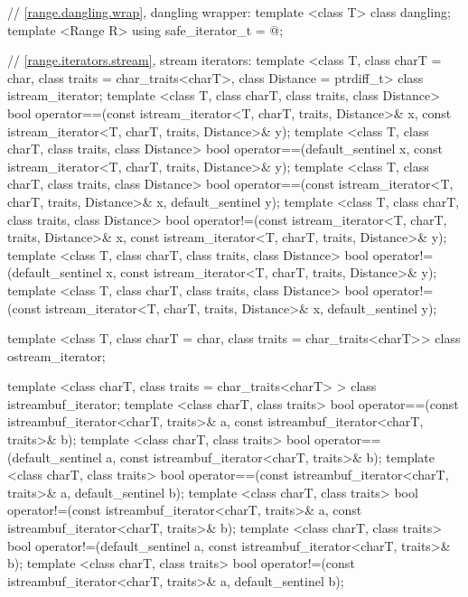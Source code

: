 {\begin{codeblock}
{{    // \ref{range.dangling.wrap}, dangling wrapper:
    template <class T> class dangling;
    template <Range R> using safe_iterator_t = @\seebelow@;

    // \ref{range.iterators.stream}, stream iterators:
    template <class T, class charT = char, class traits = char_traits<charT>,
        class Distance = ptrdiff_t>
    class istream_iterator;
    template <class T, class charT, class traits, class Distance>
      bool operator==(const istream_iterator<T, charT, traits, Distance>& x,
              const istream_iterator<T, charT, traits, Distance>& y);
    template <class T, class charT, class traits, class Distance>
      bool operator==(default_sentinel x,
              const istream_iterator<T, charT, traits, Distance>& y);
    template <class T, class charT, class traits, class Distance>
      bool operator==(const istream_iterator<T, charT, traits, Distance>& x,
              default_sentinel y);
    template <class T, class charT, class traits, class Distance>
      bool operator!=(const istream_iterator<T, charT, traits, Distance>& x,
              const istream_iterator<T, charT, traits, Distance>& y);
    template <class T, class charT, class traits, class Distance>
    bool operator!=(default_sentinel x,
              const istream_iterator<T, charT, traits, Distance>& y);
    template <class T, class charT, class traits, class Distance>
      bool operator!=(const istream_iterator<T, charT, traits, Distance>& x,
              default_sentinel y);

    template <class T, class charT = char, class traits = char_traits<charT>>
        class ostream_iterator;

    template <class charT, class traits = char_traits<charT> >
      class istreambuf_iterator;
    template <class charT, class traits>
      bool operator==(const istreambuf_iterator<charT, traits>& a,
              const istreambuf_iterator<charT, traits>& b);
    template <class charT, class traits>
      bool operator==(default_sentinel a,
              const istreambuf_iterator<charT, traits>& b);
    template <class charT, class traits>
      bool operator==(const istreambuf_iterator<charT, traits>& a,
              default_sentinel b);
    template <class charT, class traits>
      bool operator!=(const istreambuf_iterator<charT, traits>& a,
              const istreambuf_iterator<charT, traits>& b);
    template <class charT, class traits>
      bool operator!=(default_sentinel a,
              const istreambuf_iterator<charT, traits>& b);
    template <class charT, class traits>
      bool operator!=(const istreambuf_iterator<charT, traits>& a,
              default_sentinel b);

}}
\end{codeblock}}
